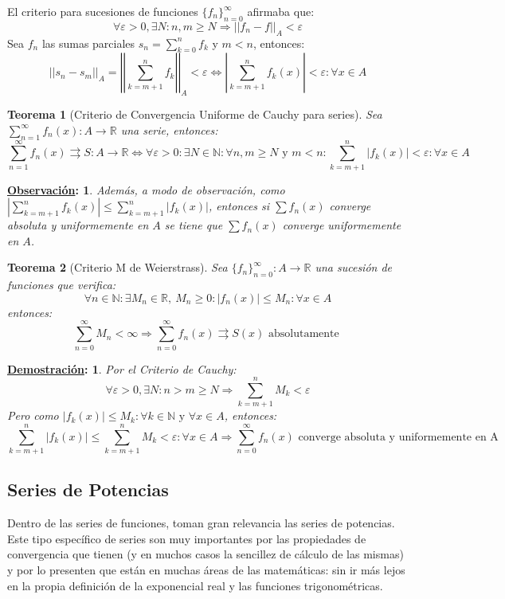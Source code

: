 \documentclass[10pt,a4paper,openright]{book}
\theoremstyle{break}
\newtheorem*{theo}{Teorema}
\newtheorem*{demo}{\underline{Demostración}:}
\newtheorem*{obs}{\underline{Observación}:}
\begin{document}
El criterio para sucesiones de funciones $\{f_n\}_{n = 0}^\infty$ afirmaba que:
$$\forall \varepsilon > 0, \exists N : n,m \geq N \Rightarrow ||f_n  - f||_A  < \varepsilon$$
Sea $f_n$ las sumas parciales $s_n =  \sum_{k=0}^{n} f_k$ y $m < n$, entonces:
$$||s_n - s_m||_A = \left|\left|\sum_{k=m + 1}^{n} f_k \right|\right|_A < \varepsilon \Leftrightarrow \left|\sum_{k=m + 1}^{n} f_k (x)\right| < \varepsilon : \forall x \in A$$

\begin{theo}[Criterio de Convergencia Uniforme de Cauchy para series]
Sea $\sum_{n=1}^\infty f_n (x): A \rightarrow \mathbb{R}$ una serie, entonces:
$$\sum_{n=1}^\infty f_n (x) \rightrightarrows S:A\rightarrow \mathbb{R} \Leftrightarrow \forall \varepsilon > 0: \exists N \in \mathbb{N}: \forall n,m \geq N \mbox{ y } m < n : \sum_{k=m + 1}^{n} |f_k (x)| < \varepsilon : \forall x \in A$$
\end{theo}

\begin{obs}
Además, a modo de observación, como $ |\sum_{k=m + 1}^{n} f_k (x)| \leq \sum_{k=m + 1}^{n} |f_k (x)| $, entonces si $\sum f_n (x)$ converge absoluta y uniformemente en $A$ se tiene que $\sum f_n (x)$ converge uniformemente en $A$.
\end{obs}

\begin{theo}[Criterio M de Weierstrass]
Sea $\{f_n\}_{n = 0}^\infty : A \rightarrow \mathbb{R}$ una sucesión de funciones que verifica:
$$\forall n \in \mathbb{N}: \exists M_n \in \mathbb{R},\  M_n \geq 0: |f_n (x)| \leq M_n : \forall x \in A$$
entonces:
$$\sum_{n= 0}^{\infty} M_n < \infty \Rightarrow \sum_{n = 0}^{\infty} f_n(x) \rightrightarrows  S(x) \mbox{ absolutamente }$$
\end{theo}
\begin{demo}
Por el Criterio de Cauchy:
$$\forall \varepsilon >0, \exists N : n > m \geq N \Rightarrow \sum_{k=m+1}^{n} M_k < \varepsilon$$
Pero como $|f_k (x)| \leq M_k : \forall k \in \mathbb{N} \mbox{ y } \forall x \in A$, entonces:
$$\sum_{k=m+1}^{n} |f_k (x)| \leq \sum_{k=m+1}^{n} M_k < \varepsilon : \forall x \in A \Rightarrow \sum_{n=0}^{\infty} f_n (x) \mbox{ converge absoluta y uniformemente en A}$$
\end{demo}

\subsection{Series de Potencias}
Dentro de las series de funciones, toman gran relevancia las series de potencias. Este tipo específico de series son muy importantes por las propiedades de convergencia que tienen (y en muchos casos la sencillez de cálculo de las mismas) y por lo presenten que están en muchas áreas de las matemáticas: sin ir más lejos en la propia definición de la exponencial real y las funciones trigonométricas.
\end{document}
